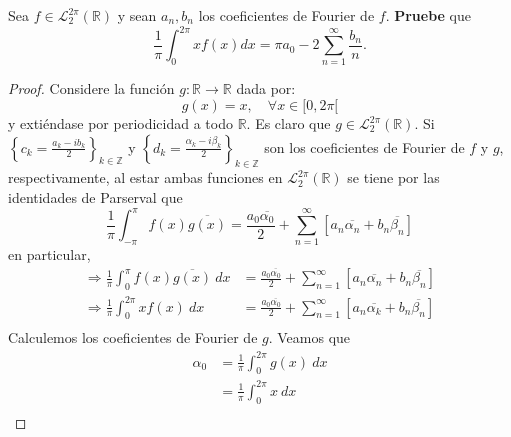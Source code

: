 \documentclass[12pt]{report}
\newcounter{it}
\theoremstyle{largebreak}
\newcommand\cf[3]{\ensuremath{#1:#2\rightarrow#3}}
\begin{document}
    \begin{excer}
        Sea $f\in\mathcal{L}_2^{2\pi}(\mathbb{R})$ y sean $a_n,b_n$ los coeficientes de Fourier de $f$. \textbf{Pruebe} que
        \begin{equation*}
            \frac{1}{\pi}\int_0^{2\pi}xf(x)dx=\pi a_0-2\sum_{ n=1}^\infty \frac{b_n}{n}.
        \end{equation*}
    \end{excer}

    \begin{proof}
        Considere la función $\cf{g}{\mathbb{R}}{\mathbb{R}}$ dada por:
        \begin{equation*}
            g(x)=x,\quad\forall x\in[0,2\pi[
        \end{equation*}
        y extiéndase por periodicidad a todo $\mathbb{R}$. Es claro que $g\in\mathcal{L}_2^{2\pi}(\mathbb{R})$. Si $\left\{c_k=\frac{a_k-ib_k}{2}\right\}_{ k\in\mathbb{Z}}$ y $\left\{d_k=\frac{\alpha_k-i\beta_k}{2}\right\}_{ k\in\mathbb{Z}}$ son los coeficientes de Fourier de $f$ y $g$, respectivamente, al estar ambas funciones en $\mathcal{L}_2^{2\pi}(\mathbb{R})$ se tiene por las identidades de Parserval que
        \begin{equation*}
            \frac{1}{\pi}\int_{-\pi}^{\pi}f(x)\overline{g(x)}=\frac{a_0\overline{\alpha_0}}{2}+\sum_{n=1}^\infty\left[a_n\overline{\alpha_n}+b_n\overline{\beta_n}\right]
        \end{equation*}
        en particular,
        \begin{equation*}
            \begin{split}
                \Rightarrow\frac{1}{\pi}\int_{0}^{\pi}f(x)\overline{g(x)}\:dx&=\frac{a_0\overline{\alpha_0}}{2}+\sum_{n=1}^\infty\left[a_n\overline{\alpha_n}+b_n\overline{\beta_n}\right]\\
                \Rightarrow \frac{1}{\pi}\int_{0}^{2\pi}xf(x)\:dx&=\frac{a_0\overline{\alpha_0}}{2}+\sum_{n=1}^\infty\left[a_n\overline{\alpha_k}+b_n\overline{\beta_n}\right]\\
            \end{split}
        \end{equation*}
        Calculemos los coeficientes de Fourier de $g$. Veamos que
        \begin{equation*}
            \begin{split}
                \alpha_0&=\frac{1}{\pi}\int_{0}^{2\pi}g(x)\:dx\\
                &=\frac{1}{\pi}\int_{0}^{2\pi}x\:dx\\

\end{split}
\end{equation*}
\end{proof}
\end{document}
